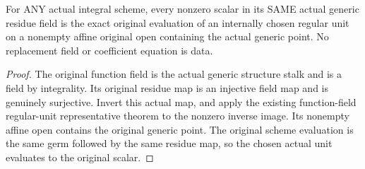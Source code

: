 \begin{lemma}
\label{lem:intrinsic-numerical-generic-residue-local-unit}
\leanok
{}
For ANY actual integral scheme, every nonzero scalar in its SAME actual
generic residue field is the exact original evaluation of an internally
chosen regular unit on a nonempty affine original open containing the
actual generic point. No replacement field or coefficient equation is data.
\end{lemma}
\begin{proof}
The original function field is the actual generic structure stalk and is a
field by integrality. Its original residue map is an injective field map
and is genuinely surjective. Invert this actual map, and apply the existing
function-field regular-unit representative theorem to the nonzero inverse
image. Its nonempty affine open contains the original generic point. The
original scheme evaluation is the same germ followed by the same residue
map, so the chosen actual unit evaluates to the original scalar.
\end{proof}

